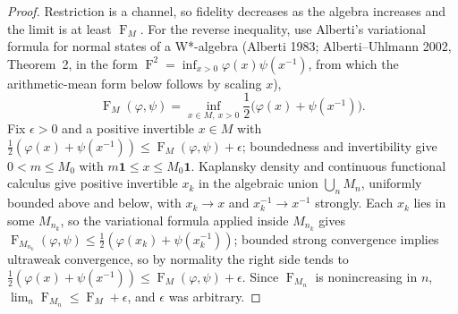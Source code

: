 \documentclass[11pt]{article}
\theoremstyle{accent}
\theoremstyle{definition}
\newcommand{\one}{\mathbf{1}}
\newcommand{\Fid}{\operatorname{F}}
\begin{document}
\begin{proof}
Restriction is a channel, so fidelity decreases as the algebra increases and the limit is at least \(\Fid_M\).  For the reverse inequality, use Alberti's variational formula for normal states of a W*-algebra (Alberti 1983; Alberti--Uhlmann 2002, Theorem~2, in the form \(\Fid^2=\inf_{x>0}\varphi(x)\psi(x^{-1})\), from which the arithmetic-mean form below follows by scaling \(x\)),
\[
 \Fid_M(\varphi,\psi)
 =\inf_{x\in M,\ x>0}
 \frac12\bigl(\varphi(x)+\psi(x^{-1})\bigr).
\]
Fix \(\epsilon>0\) and a positive invertible \(x\in M\) with \(\frac12(\varphi(x)+\psi(x^{-1}))\le\Fid_M(\varphi,\psi)+\epsilon\); boundedness and invertibility give \(0<m\le M_0\) with \(m\one\le x\le M_0\one\).  Kaplansky density and continuous functional calculus give positive invertible \(x_k\) in the algebraic union \(\bigcup_nM_n\), uniformly bounded above and below, with \(x_k\to x\) and \(x_k^{-1}\to x^{-1}\) strongly.  Each \(x_k\) lies in some \(M_{n_k}\), so the variational formula applied inside \(M_{n_k}\) gives \(\Fid_{M_{n_k}}(\varphi,\psi)\le\frac12(\varphi(x_k)+\psi(x_k^{-1}))\); bounded strong convergence implies ultraweak convergence, so by normality the right side tends to \(\frac12(\varphi(x)+\psi(x^{-1}))\le\Fid_M(\varphi,\psi)+\epsilon\).  Since \(\Fid_{M_n}\) is nonincreasing in \(n\), \(\lim_n\Fid_{M_n}\le\Fid_M+\epsilon\), and \(\epsilon\) was arbitrary.
\end{proof}
\end{document}
